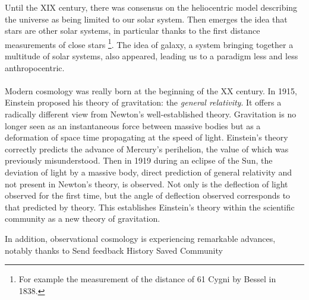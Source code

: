 \documentclass[11pt, twoside, a4paper, openright]{report}
\begin{document}
Until the \textsc{XIX} \th century, there was consensus on the heliocentric model describing the universe as being limited to our solar system. Then emerges the idea that stars are other solar systems, in particular thanks to the first distance measurements of close stars \footnote{For example the measurement of the distance of 61 Cygni by Bessel in 1838.}. The idea of ​​galaxy, a system bringing together a multitude of solar systems, also appeared, leading us to a paradigm less and less anthropocentric.

\paragraph{}
Modern cosmology was really born at the beginning of the \textsc{XX} \th century. In 1915, Einstein proposed his theory of gravitation: the \emph{general relativity}. It offers a radically different view from Newton's well-established theory. Gravitation is no longer seen as an instantaneous force between massive bodies but as a deformation of space time propagating at the speed of light. Einstein's theory correctly predicts the advance of Mercury's perihelion, the value of which was previously misunderstood. Then in 1919 during an eclipse of the Sun, the deviation of light by a massive body, direct prediction of general relativity and not present in Newton's theory, is observed. Not only is the deflection of light observed for the first time, but the angle of deflection observed corresponds to that predicted by theory. This establishes Einstein's theory within the scientific community as a new theory of gravitation.

In addition, observational cosmology is experiencing remarkable advances, notably thanks to
Send feedback
History
Saved
Community
\end{document}
